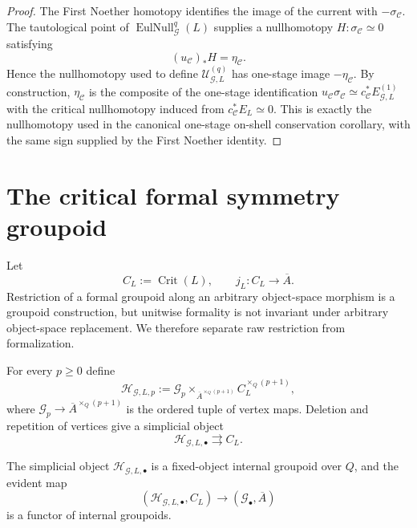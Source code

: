 \begin{proof}
The First Noether homotopy identifies the image of the current with
$-\sigma_{\mathcal C}$.  The tautological point of
$\operatorname{EulNull}_{\mathcal G}^{q}(L)$ supplies a nullhomotopy
$H:\sigma_{\mathcal C}\simeq0$ satisfying
\[
(u_{\mathcal C})_*H=\eta_{\mathcal C}.
\]
Hence the nullhomotopy used to define
$\mathcal U_{\mathcal G,L}^{(q)}$ has one-stage image
$-\eta_{\mathcal C}$.  By construction, $\eta_{\mathcal C}$ is the composite of
the one-stage identification
$u_{\mathcal C}\sigma_{\mathcal C}\simeq
c_{\mathcal C}^*E_{\mathcal G,L}^{(1)}$
with the critical nullhomotopy induced from
$c_{\mathcal C}^*E_L\simeq0$.  This is exactly the nullhomotopy used in the
canonical one-stage on-shell conservation corollary, with the same sign supplied
by the First Noether identity.
\end{proof}

\section{The critical formal symmetry groupoid}
\label{sec:symmetry-noether-the-critical-formal-symmetry-groupoid}

Let
\[
C_L:=\operatorname{Crit}(L),
\qquad
j_L:C_L\longrightarrow\overline A.
\]
Restriction of a formal groupoid along an arbitrary object-space morphism is
a groupoid construction, but unitwise formality is not invariant under
arbitrary object-space replacement.  We therefore separate raw restriction
from formalization.

\begin{construction}
\label{constr:symmetry-noether-raw-critical-restriction-groupoid}
For every $p\ge0$ define
\[
\mathcal H_{\mathcal G,L,p}
:=
\mathcal G_p
\times_{\overline A^{\times_Q(p+1)}}
C_L^{\times_Q(p+1)},
\]
where $\mathcal G_p\to\overline A^{\times_Q(p+1)}$ is the ordered tuple of
vertex maps.  Deletion and repetition of vertices give a simplicial object
\[
\mathcal H_{\mathcal G,L,\bullet}
\rightrightarrows
C_L.
\]
\end{construction}

\begin{proposition}
\label{prop:symmetry-noether-raw-critical-restriction-is-a-groupoid}
The simplicial object
$\mathcal H_{\mathcal G,L,\bullet}$ is a fixed-object internal groupoid over
$Q$, and the evident map
\[
(\mathcal H_{\mathcal G,L,\bullet},C_L)
\longrightarrow
(\mathcal G_\bullet,\overline A)
\]
is a functor of internal groupoids.
\end{proposition}

